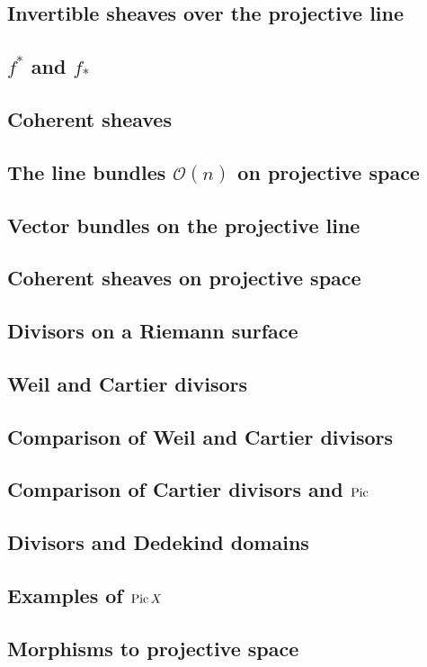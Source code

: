 \documentclass[11pt, oneside,margin=1in]{article}
\begin{document}
\subsection{Invertible sheaves over the projective line}
\subsection{$f^*$ and $f_*$}
\subsection{Coherent sheaves}
\subsection{The line bundles $\mathscr O(n)$ on projective space}
\subsection{Vector bundles on the projective line}
\subsection{Coherent sheaves on projective space}
\subsection{Divisors on a Riemann surface}
\subsection{Weil and Cartier divisors}
\subsection{Comparison of Weil and Cartier divisors}
\subsection{Comparison of Cartier divisors and $\operatorname{Pic}$}
\subsection{Divisors and Dedekind domains}
\subsection{Examples of $\operatorname{Pic} X$}
\subsection{Morphisms to projective space}
\end{document}
